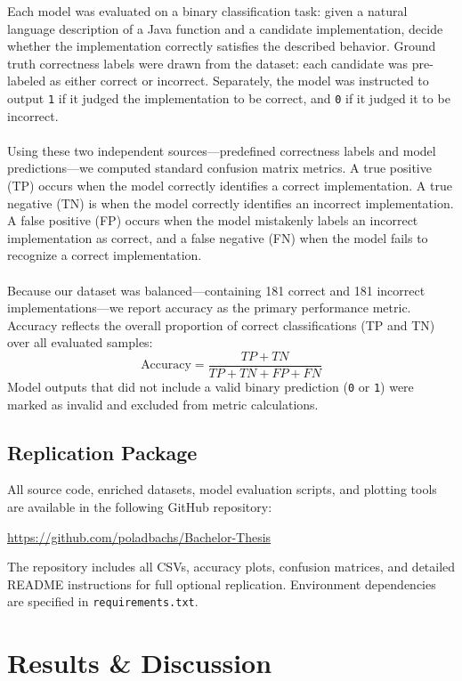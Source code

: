 \documentclass[a4paper]{usiinfbachelorproject}
\begin{document}
Each model was evaluated on a binary classification task: given a natural language description of a Java function and a candidate implementation, decide whether the implementation correctly satisfies the described behavior. Ground truth correctness labels were drawn from the dataset: each candidate was pre-labeled as either correct or incorrect. Separately, the model was instructed to output \texttt{1} if it judged the implementation to be correct, and \texttt{0} if it judged it to be incorrect.\\
\\
Using these two independent sources—predefined correctness labels and model predictions—we computed standard confusion matrix metrics. A true positive (TP) occurs when the model correctly identifies a correct implementation. A true negative (TN) is when the model correctly identifies an incorrect implementation. A false positive (FP) occurs when the model mistakenly labels an incorrect implementation as correct, and a false negative (FN) when the model fails to recognize a correct implementation.\\
\\[2pt]
Because our dataset was balanced—containing 181 correct and 181 incorrect implementations—we report accuracy as the primary performance metric. Accuracy reflects the overall proportion of correct classifications (TP and TN) over all evaluated samples:
\[
\text{Accuracy} = \frac{TP + TN}{TP + TN + FP + FN}
\]
Model outputs that did not include a valid binary prediction (\texttt{0} or \texttt{1}) were marked as invalid and excluded from metric calculations.


\subsection{Replication Package}\label{sec:replication}
All source code, enriched datasets, model evaluation scripts, and plotting tools are available in the following GitHub repository:
\begin{center}
\url{https://github.com/poladbachs/Bachelor-Thesis}
\end{center}
The repository includes all CSVs, accuracy plots, confusion matrices, and detailed README instructions for full optional replication. Environment dependencies are specified in \texttt{requirements.txt}.

\section{Results \& Discussion}\label{sec:results}
\end{document}
